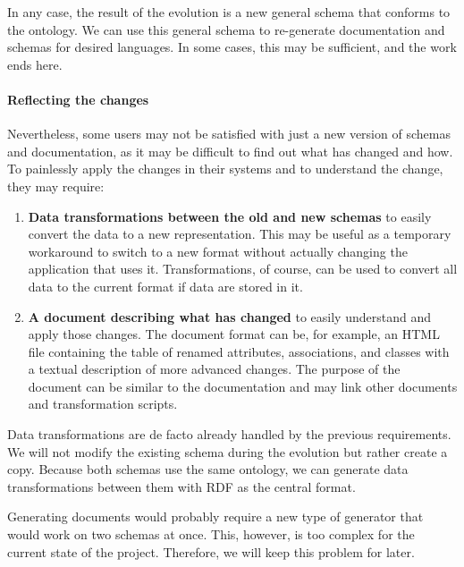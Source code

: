 In any case, the result of the evolution is a new general schema that conforms to the ontology. We can use this general schema to re-generate documentation and schemas for desired languages. In some cases, this may be sufficient, and the work ends here.

\paragraph{Reflecting the changes} Nevertheless, some users may not be satisfied with just a new version of schemas and documentation, as it may be difficult to find out what has changed and how. To painlessly apply the changes in their systems and  to understand the change, they may require:

\begin{enumerate}
    \item \textbf{Data transformations between the old and new schemas} to easily convert the data to a new representation. This may be useful as a temporary workaround to switch to a new format without actually changing the application that uses it. Transformations, of course, can be used to convert all data to the current format if data are stored in it.
    \item \textbf{A document describing what has changed} to easily understand and apply those changes. The document format can be, for example, an HTML file containing the table of renamed attributes, associations, and classes with a textual description of more advanced changes. The purpose of the document can be similar to the documentation and may link other documents and transformation scripts.
\end{enumerate}

Data transformations are de facto already handled by the previous requirements. We will not modify the existing schema during the evolution but rather create a copy. Because both schemas use the same ontology, we can generate data transformations between them with RDF as the central format.

Generating documents would probably require a new type of generator that would work on two schemas at once. This, however, is too complex for the current state of the project. Therefore, we will keep this problem for later.
